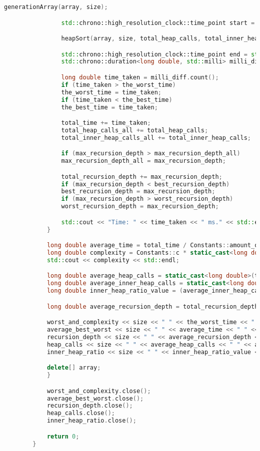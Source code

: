 \documentclass[12pt, a4paper]{report}
\begin{document}
\begin{lstlisting}[language=C++]
			    generationArray(array, size);

			    std::chrono::high_resolution_clock::time_point start = std::chrono::high_resolution_clock::now();

			    heapSort(array, size, total_heap_calls, total_inner_heap_calls, max_recursion_depth);

			    std::chrono::high_resolution_clock::time_point end = std::chrono::high_resolution_clock::now();
			    std::chrono::duration<long double, std::milli> milli_diff = end - start;

			    long double time_taken = milli_diff.count();
			    if (time_taken > the_worst_time)
				the_worst_time = time_taken;
			    if (time_taken < the_best_time)
				the_best_time = time_taken;

			    total_time += time_taken;
			    total_heap_calls_all += total_heap_calls;
			    total_inner_heap_calls_all += total_inner_heap_calls;

			    if (max_recursion_depth > max_recursion_depth_all)
				max_recursion_depth_all = max_recursion_depth;

			    total_recursion_depth += max_recursion_depth;
			    if (max_recursion_depth < best_recursion_depth)
				best_recursion_depth = max_recursion_depth;
			    if (max_recursion_depth > worst_recursion_depth)
				worst_recursion_depth = max_recursion_depth;

			    std::cout << "Time: " << time_taken << " ms." << std::endl;
			}

			long double average_time = total_time / Constants::amount_of_attempts;
			long double complexity = Constants::c * static_cast<long double>(size) * std::log(size);
			std::cout << complexity << std::endl;

			long double average_heap_calls = static_cast<long double>(total_heap_calls_all) / Constants::amount_of_attempts;
			long double average_inner_heap_calls = static_cast<long double>(total_inner_heap_calls_all) / Constants::amount_of_attempts;
			long double inner_heap_ratio_value = (average_inner_heap_calls / average_heap_calls) * 100.0;

			long double average_recursion_depth = total_recursion_depth / Constants::amount_of_attempts;

			worst_and_complexity << size << " " << the_worst_time << " " << complexity << std::endl;
			average_best_worst << size << " " << average_time << " " << the_best_time << " " << the_worst_time << std::endl;
			recursion_depth << size << " " << average_recursion_depth << " " << best_recursion_depth << " " << worst_recursion_depth << std::endl;
			heap_calls << size << " " << average_heap_calls << " " << average_inner_heap_calls << std::endl;
			inner_heap_ratio << size << " " << inner_heap_ratio_value << std::endl;

			delete[] array;
		    }

		    worst_and_complexity.close();
		    average_best_worst.close();
		    recursion_depth.close();
		    heap_calls.close();
		    inner_heap_ratio.close();

		    return 0;
		}
	\end{lstlisting}
\end{document}
